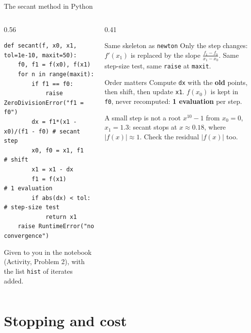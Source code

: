\documentclass[aspectratio=169]{beamer}
\begin{document}
\begin{frame}[fragile]{The secant method in Python}
\begin{columns}[T]
\begin{column}{0.56\textwidth}
\begin{lstlisting}[basicstyle=\ttfamily\scriptsize]
def secant(f, x0, x1, tol=1e-10, maxit=50):
    f0, f1 = f(x0), f(x1)
    for n in range(maxit):
        if f1 == f0:
            raise ZeroDivisionError("f1 = f0")
        dx = f1*(x1 - x0)/(f1 - f0) # secant step
        x0, f0 = x1, f1    # shift
        x1 = x1 - dx
        f1 = f(x1)         # 1 evaluation
        if abs(dx) < tol:  # step-size test
            return x1
    raise RuntimeError("no convergence")
\end{lstlisting}
\vspace{0.05cm}
\scriptsize Given to you in the notebook (Activity, Problem 2), with the list \texttt{hist} of iterates added.
\end{column}
\begin{column}{0.41\textwidth}
\begin{block}{Same skeleton as \texttt{newton}}
\footnotesize Only the step changes: $f'(x_1)$ is replaced by the slope $\frac{f_1 - f_0}{x_1 - x_0}$. Same step-size test, same \texttt{raise} at \texttt{maxit}.
\end{block}
\vspace{0.05cm}
\begin{block}{Order matters}
\footnotesize Compute \texttt{dx} with the \textbf{old} points, then shift, then update \texttt{x1}. $f(x_0)$ is kept in \texttt{f0}, never recomputed: \textbf{1 evaluation} per step.
\end{block}
\vspace{0.05cm}
\begin{alertblock}{A small step is not a root}
\scriptsize $x^{10}-1$ from $x_0 = 0$, $x_1 = 1.3$: secant stops at $x \approx 0.18$, where $|f(x)| \approx 1$. Check the residual $|f(x)|$ too.
\end{alertblock}
\end{column}
\end{columns}
\end{frame}

\section{Stopping and cost}
\end{document}
